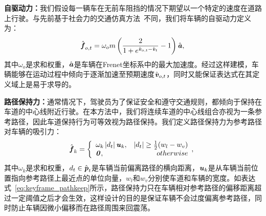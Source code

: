 \textbf{自驱动力：}我们假设每一辆车在无前车阻挡的情况下期望以一个特定的速度在道路上行驶。与先前基于社会力的交通仿真方法~\cite{chao2019force, chao2021calibrated}不同，我们将车辆的自驱动力定义为：
\begin{equation}
\setlength\abovedisplayskip{6pt}
\setlength\belowdisplayskip{6pt}
\label{eq:keyframe_selfmotivate}
    \hat{\textbf{\emph{f}}}_{o,t} = \omega_o m \left( \frac{2}{1+e^{\hat{\textbf{\emph{v}}}_{o,t} - \hat{\textbf{\emph{v}}}_{t}}} - 1 \right) \hat{\textbf{\emph{a}}},
\end{equation}
其中$\omega_o$是求和权重，$\hat{\textbf{\emph{a}}}$是车辆在Frenet坐标系中的最大加速度。经过这样建模，车辆能够在运动过程中倾向于逐渐加速至预期速度$\hat{\textbf{\emph{v}}}_{o,t}$，同时又能保证表达式在其定义域上是易于求导的。

\textbf{路径保持力：}通常情况下，驾驶员为了保证安全和遵守交通规则，都倾向于保持在车道的中心线附近行驶。在本方法中，我们将连续车道的中心线组合亦视为一条参考路径，因此车道保持行为可等效视为路径保持。我们定义路径保持力为参考路径对车辆的吸引力：
\begin{equation}
\setlength\abovedisplayskip{6pt}
\setlength\belowdisplayskip{6pt}
\label{eq:keyframe_pathkeep}
    \hat{\textbf{\emph{f}}}_{k} = 
    \left\{
        \begin{array}{lr}
        \omega_{k} \left| d_t \right| \textbf{\emph{u}}_k, & \left| d_t \right| \geq \frac{1}{2}(w_l - w_v) \\
        \textbf{\emph{0}}, & otherwise
        \end{array}, 
    \right.
\end{equation}
其中$\omega_k$是求和权重，$d_t\in\hat{\textbf{\emph{p}}}_t$是车辆当前偏离路径的横向距离，$\textbf{\emph{u}}_k$是从车辆当前位置指向参考路径上最近点的单位向量，$w_l$和$w_v$分别使车道和车辆的宽度。如表达式~\ref{eq:keyframe_pathkeep}所示，路径保持力只在车辆相对参考路径的偏移距离超过一定阈值之后才会生效，这样设计的目的是保证车辆不会过度偏离参考路径，同时防止车辆因微小偏移而在路径周围来回震荡。

